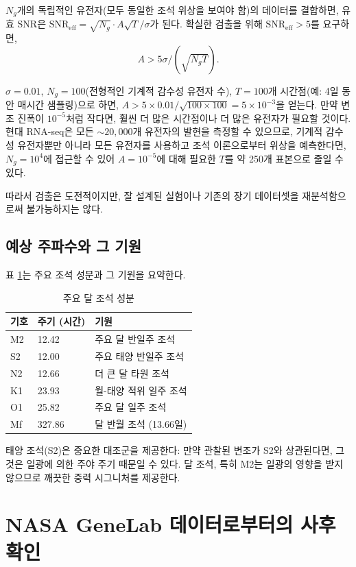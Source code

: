\documentclass[12pt,a4paper]{article}
\theoremstyle{remark}
\begin{document}
	\(N_g\)개의 독립적인 유전자(모두 동일한 조석 위상을 보여야 함)의 데이터를 결합하면, 유효 SNR은 \(\mathrm{SNR}_{\text{eff}} = \sqrt{N_g} \cdot A \sqrt{T} / \sigma\)가 된다. 확실한 검출을 위해 \(\mathrm{SNR}_{\text{eff}} > 5\)를 요구하면,
	\[
	A > 5 \sigma / (\sqrt{N_g T}).
	\]
	
	\(\sigma = 0.01\), \(N_g = 100\)(전형적인 기계적 감수성 유전자 수), \(T = 100\)개 시간점(예: 4일 동안 매시간 샘플링)으로 하면, \(A > 5\times 0.01 / \sqrt{100\times 100} = 5\times 10^{-3}\)을 얻는다. 만약 변조 진폭이 \(10^{-5}\)처럼 작다면, 훨씬 더 많은 시간점이나 더 많은 유전자가 필요할 것이다. 현대 RNA-seq은 모든 \(\sim 20,000\)개 유전자의 발현을 측정할 수 있으므로, 기계적 감수성 유전자뿐만 아니라 모든 유전자를 사용하고 조석 이론으로부터 위상을 예측한다면, \(N_g = 10^4\)에 접근할 수 있어 \(A = 10^{-5}\)에 대해 필요한 \(T\)를 약 250개 표본으로 줄일 수 있다.
	
	따라서 검출은 도전적이지만, 잘 설계된 실험이나 기존의 장기 데이터셋을 재분석함으로써 불가능하지는 않다.
	
	\subsection{예상 주파수와 그 기원}
	
	표 \ref{tab:tides}는 주요 조석 성분과 그 기원을 요약한다.
	
	\begin{table}[htbp]
		\centering
		\caption{주요 달 조석 성분}
		\label{tab:tides}
		\small
		\begin{tabular}{lll}
			\toprule
			기호 & 주기 (시간) & 기원 \\
			\midrule
			M2 & 12.42 & 주요 달 반일주 조석 \\
			S2 & 12.00 & 주요 태양 반일주 조석 \\
			N2 & 12.66 & 더 큰 달 타원 조석 \\
			K1 & 23.93 & 월-태양 적위 일주 조석 \\
			O1 & 25.82 & 주요 달 일주 조석 \\
			Mf & 327.86 & 달 반월 조석 (13.66일) \\
			\bottomrule
		\end{tabular}
	\end{table}
	
	태양 조석(S2)은 중요한 대조군을 제공한다: 만약 관찰된 변조가 S2와 상관된다면, 그것은 일광에 의한 주야 주기 때문일 수 있다. 달 조석, 특히 M2는 일광의 영향을 받지 않으므로 깨끗한 중력 시그니처를 제공한다.
	
	\section{NASA GeneLab 데이터로부터의 사후 확인}
	\label{sec:genelab}
	
\end{document}
